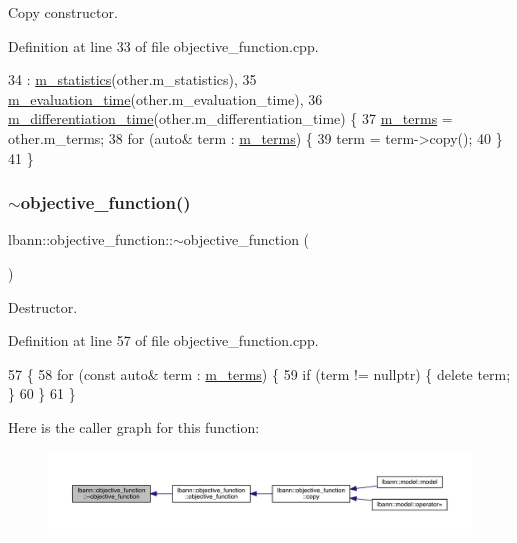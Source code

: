 Copy constructor. 

Definition at line 33 of file objective\+\_\+function.\+cpp.


\begin{DoxyCode}
34   : \hyperlink{classlbann_1_1objective__function_ad5daa18c52374a849c6fbd515bcc1eb1}{m\_statistics}(other.m\_statistics),
35     \hyperlink{classlbann_1_1objective__function_a9ef17c7204cd371261c9c083d86de91a}{m\_evaluation\_time}(other.m\_evaluation\_time),
36     \hyperlink{classlbann_1_1objective__function_ae526559f3a530f540a29407ea64bbea6}{m\_differentiation\_time}(other.m\_differentiation\_time) \{
37   \hyperlink{classlbann_1_1objective__function_aea9c1f90ba9af1b1330efa2ba6adb5e2}{m\_terms} = other.m\_terms;
38   \textcolor{keywordflow}{for} (\textcolor{keyword}{auto}& term : \hyperlink{classlbann_1_1objective__function_aea9c1f90ba9af1b1330efa2ba6adb5e2}{m\_terms}) \{
39     term = term->copy();
40   \}
41 \}
\end{DoxyCode}
\mbox{\label{classlbann_1_1objective__function_a823ebffb8056cb4a9ff0b2af7cf084b4}} 
\subsubsection{\texorpdfstring{$\sim$objective\+\_\+function()}{~objective\_function()}}
{\footnotesize\ttfamily lbann\+::objective\+\_\+function\+::$\sim$objective\+\_\+function (\begin{DoxyParamCaption}{ }\end{DoxyParamCaption})}

Destructor. 

Definition at line 57 of file objective\+\_\+function.\+cpp.


\begin{DoxyCode}
57                                         \{
58   \textcolor{keywordflow}{for} (\textcolor{keyword}{const} \textcolor{keyword}{auto}& term : \hyperlink{classlbann_1_1objective__function_aea9c1f90ba9af1b1330efa2ba6adb5e2}{m\_terms}) \{
59     \textcolor{keywordflow}{if} (term != \textcolor{keyword}{nullptr}) \{ \textcolor{keyword}{delete} term; \}
60   \}
61 \}
\end{DoxyCode}
Here is the caller graph for this function\+:\nopagebreak
\begin{figure}[H]
\begin{center}
\leavevmode
\includegraphics[width=350pt]{classlbann_1_1objective__function_a823ebffb8056cb4a9ff0b2af7cf084b4_icgraph}
\end{center}
\end{figure}


